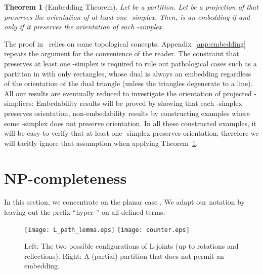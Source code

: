 \documentclass[12pt]{article}
\newtheorem{theorem}{Theorem}
\begin{document}
\begin{theorem}[Embedding Theorem]\label{thm:embedding}
Let  be a partition.
Let  be a projection of  that preserves
the orientation of at least one -simplex.
Then,  is an embedding if and only if 
it preserves the orientation of each -simplex.
\end{theorem}

The proof in~\cite{ek-freudenthal} relies on some topological concepts;
Appendix~\ref{app:embedding} repeats the argument for the convenience of the reader.
The constraint that  preserves at least one -simplex
is required to rule out pathological cases such as a partition in 
with only  rectangles, whose dual is always an embedding regardless of the orientation
of the dual triangle (unless the triangles degenerate to a line).
All our results are eventually reduced to investigate
the orientation of projected -simplices: Embedability results will be proved
by showing that each -simplex preserves orientation, non-embedability results
by constructing examples where some -simplex does not preserve orientation.
In all these constructed examples, it will be easy to verify
that at least one -simplex preserves orientation; therefore we will tacitly
ignore that assumption when applying Theorem~\ref{thm:embedding}.


\section{NP-completeness}
\label{sec:NP}

In this section, we concentrate on the planar case . We adapt our notation
by leaving out the prefix ``hyper-'' on all defined terms.

\begin{figure}
\begin{center}
\texttt{[image: L\_path\_lemma.eps]}
\hspace{2cm}
\texttt{[image: counter.eps]}
\end{center}
\caption{Left: The two possible configurations of L-joints (up to rotations and reflections).
Right: A (partial) partition that does not permit an embedding.}
\label{fig:L-joint}
\label{fig:counter}
\end{figure}
\end{document}
